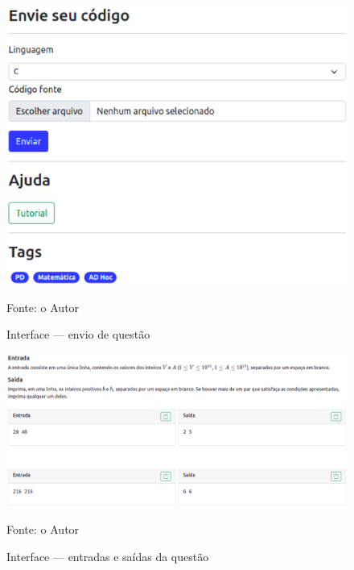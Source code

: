 \begin{figure}[H]
    \centering
    \caption{Interface — envio de questão}
    \includegraphics[keepaspectratio=true,scale=0.5]{figuras/sendQuestion1.eps}
    \label{fig:sendQuestion1}
    
    \medskip
    Fonte: o Autor
    \medskip
\end{figure}
    
\begin{figure}[H]
    \centering
    \caption{Interface — entradas e saídas da questão}
    \includegraphics[keepaspectratio=true,scale=0.35]{figuras/questionInputs.eps}
    \label{fig:questionInputs}
    
    \medskip
    Fonte: o Autor
    \medskip
\end{figure}

